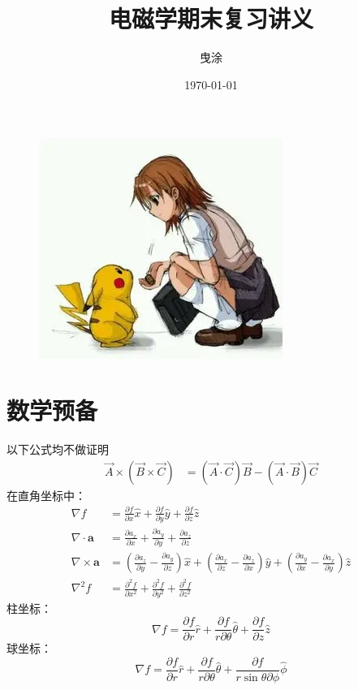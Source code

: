 \documentclass[12pt, a4paper, oneside]{ctexart}
\title{电磁学期末复习讲义}
\author{曳涂}
\date{\today}
\begin{document}
\maketitle
\begin{center}
    \begin{figure}[htbp]
       \centerline{ \includegraphics*{dfx6sr6m.png}}
    \end{figure}
\end{center}
\newpage

\tableofcontents
\newpage
\section{数学预备}
以下公式均不做证明
$$\begin{aligned}
    \vec{A}\times(\vec{B}\times\vec{C})&=(\vec{A}\cdot\vec{C})\vec{B}-(\vec{A}\cdot\vec{B})\vec{C}
\end{aligned}$$
在直角坐标中：
$$\begin{aligned}
\nabla f&=\frac{\partial f}{\partial x}\hat{x}+\frac{\partial f}{\partial y}\hat{y}+\frac{\partial f}{\partial z}\hat{z}\\
\nabla \cdot \mathbf{a}&=\frac{\partial a_x}{\partial x}+\frac{\partial a_y}{\partial y}+\frac{\partial a_z}{\partial z}\\
\nabla \times \mathbf{a}&=(\frac{\partial a_z}{\partial y}-\frac{\partial a_y}{\partial z})\hat{x}+(\frac{\partial a_x}{\partial z}-\frac{\partial a_z}{\partial x})\hat{y}+(\frac{\partial a_y}{\partial x}-\frac{\partial a_x}{\partial y})\hat{z}\\
\nabla^2f&=\frac{\partial^2 f}{\partial x^2}+\frac{\partial^2 f}{\partial y^2}+\frac{\partial^2 f}{\partial z^2}
\end{aligned}$$
柱坐标：
$$\nabla f=\frac{\partial f}{\partial r}\hat{r}+\frac{\partial f}{r\partial\theta}\hat{\theta}+\frac{\partial f}{\partial z}\hat{z}$$
球坐标：
$$\nabla f=\frac{\partial f}{\partial r}\hat{r}+\frac{\partial f}{r\partial\theta}\hat{\theta}+\frac{\partial f}{r\sin\theta\partial \phi}\hat{\phi}$$
\newpage
\end{document}
